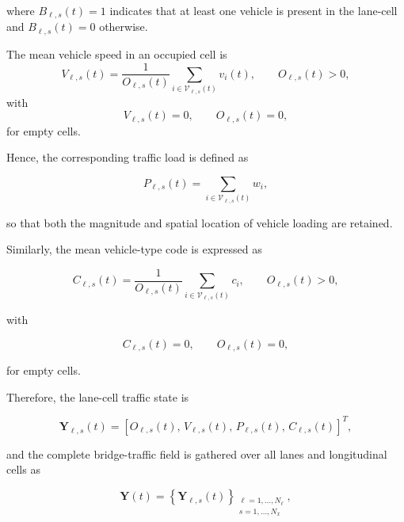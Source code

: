 \documentclass[journal]{IEEEtran}
\begin{document}
where $B_{\ell,s}(t)=1$ indicates that at least one vehicle is present
in the lane-cell and $B_{\ell,s}(t)=0$ otherwise.

The mean vehicle speed in an occupied cell is
\begin{equation}
V_{\ell,s}(t)
=
\frac{1}{O_{\ell,s}(t)}
\sum_{i\in\mathcal{V}_{\ell,s}(t)}
v_i(t),
\qquad
O_{\ell,s}(t)>0,
\label{eq:mean_vehicle_speed}
\end{equation}
with
\begin{equation}
V_{\ell,s}(t)=0,
\qquad
O_{\ell,s}(t)=0,
\label{eq:empty_vehicle_speed}
\end{equation}
for empty cells.

Hence, the corresponding traffic load is defined as

\begin{equation}
P_{\ell,s}(t)
=
\sum_{i\in\mathcal{V}_{\ell,s}(t)}
w_i,
\label{eq:cell_load}
\end{equation}

so that both the magnitude and spatial location of vehicle loading are retained.

Similarly, the mean vehicle-type code is expressed as

\begin{equation}
C_{\ell,s}(t)
=
\frac{1}{O_{\ell,s}(t)}
\sum_{i\in\mathcal{V}_{\ell,s}(t)}
c_i,
\qquad
O_{\ell,s}(t)>0,
\label{eq:mean_vehicle_type}
\end{equation}

with

\begin{equation}
C_{\ell,s}(t)=0,
\qquad
O_{\ell,s}(t)=0,
\label{eq:empty_vehicle_type}
\end{equation}

for empty cells.

Therefore, the lane-cell traffic state is

\begin{equation}
\mathbf{Y}_{\ell,s}(t)
=
\left[
O_{\ell,s}(t),\,
V_{\ell,s}(t),\,
P_{\ell,s}(t),\,
C_{\ell,s}(t)
\right]^{T},
\label{eq:lane_cell_state}
\end{equation}

and the complete bridge-traffic field is gathered over all lanes and longitudinal cells as

\begin{equation}
\mathbf{Y}(t)
=
\left\{
\mathbf{Y}_{\ell,s}(t)
\right\}_{
\substack{
\ell=1,\ldots,N_{\ell}\\
s=1,\ldots,N_x
}},
\label{eq:traffic_field}
\end{equation}
\end{document}
